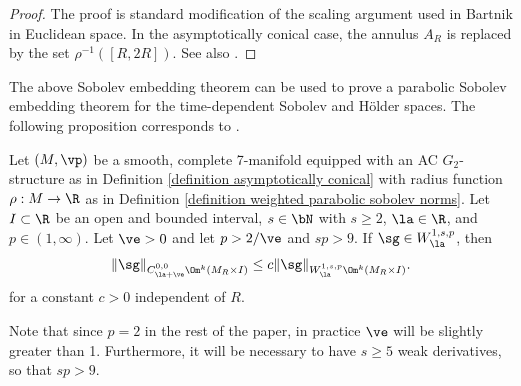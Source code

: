 \documentclass[hidelinks, 12pt, oneside, reqno]{amsart}
\begin{document}
\begin{proof}
    The proof is standard modification of the scaling argument used in Bartnik \cite[Theorem 1.2]{BartnikMass} in Euclidean space. In the asymptotically conical case, the annulus $A_R$ is replaced by the set $\rho^{-1}([R, 2R])$. See also \cite[Theorem 2.9]{JoyceDesing1}.
\end{proof}

The above Sobolev embedding theorem can be used to prove a parabolic Sobolev embedding theorem for the time-dependent Sobolev and H\"older spaces. The following proposition corresponds to \cite[Proposition 7.2]{LMCFwithsings}. 

\begin{prop}\label{proposition parabolic weighted Sobolev embedding} Let $(M,\vp)$ be a smooth, complete 7-manifold equipped with an AC $G_2$-structure as in Definition \ref{definition asymptotically conical} with radius function $\rho: M \rightarrow \R$ as in Definition \ref{definition weighted parabolic sobolev norms}. Let $I \subset \R$ be an open and bounded interval, $s \in \bN$ with $s \ge 2$, $\la \in \R$, and $p \in (1, \infty)$. Let $\ve > 0$ and let $p > 2/\ve$ and $sp > 9$.  If  $\sg \in W^{1,s,p}_\la $, then
    \[
    \|\sg\|_{C^{0,0}_{\la + \ve}\Om^k(M_R \times I)} \le c\|\sg\|_{W^{1,s,p}_{\la}\Om^k(M_R \times I)}.
    \]
for a constant $c >0$ independent of $R$.
\end{prop}

\begin{rmk}\label{remark consequences of sobolev embedding}
    Note that since $p = 2$ in the rest of the paper, in practice $\ve$ will be slightly greater than 1. Furthermore, it will be necessary to have $s \ge 5$ weak derivatives, so that $sp > 9$. 
\end{rmk}
\end{document}
